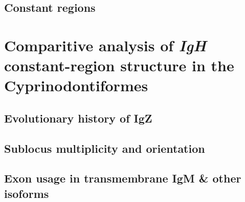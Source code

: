 	\subsection{Constant regions}

\section{Comparitive analysis of \textit{IgH} constant-region structure in the Cyprinodontiformes}

	\subsection{Evolutionary history of IgZ}
	
	\subsection{Sublocus multiplicity and orientation}
	
	\subsection{Exon usage in transmembrane IgM \& other isoforms}






